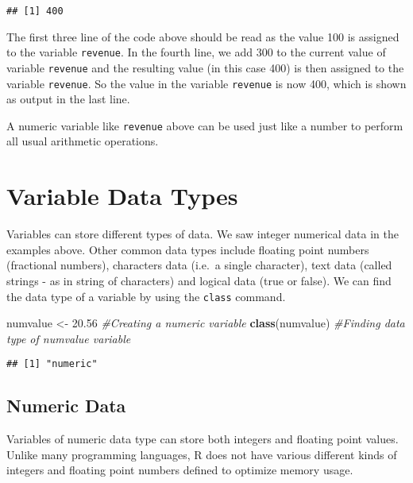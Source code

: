 \documentclass[
]{krantz}
\makeatletter
\newenvironment{Shaded}{\begin{snugshade}}{\end{snugshade}}
\newcommand{\CommentTok}[1]{\textcolor[rgb]{0.37,0.37,0.37}{\textit{#1}}}
\newcommand{\FloatTok}[1]{\textcolor[rgb]{0.06,0.06,0.06}{#1}}
\newcommand{\KeywordTok}[1]{\textcolor[rgb]{0.27,0.27,0.27}{\textbf{#1}}}
\newcommand{\NormalTok}[1]{#1}
\newcommand{\StringTok}[1]{\textcolor[rgb]{0.5,0.5,0.5}{#1}}
\newenvironment{kframe}{%
\medskip{}
\setlength{\fboxsep}{.8em}
 \def\at@end@of@kframe{}%
 \ifinner\ifhmode%
  \def\at@end@of@kframe{\end{minipage}}%
  \begin{minipage}{\columnwidth}%
 \fi\fi%
 \def\FrameCommand##1{\hskip\@totalleftmargin \hskip-\fboxsep
 \colorbox{shadecolor}{##1}\hskip-\fboxsep
     \hskip-\linewidth \hskip-\@totalleftmargin \hskip\columnwidth}%
 \MakeFramed {\advance\hsize-\width
   \@totalleftmargin\z@ \linewidth\hsize
   \@setminipage}}%
 {\par\unskip\endMakeFramed%
 \at@end@of@kframe}
\renewenvironment{Shaded}{\begin{kframe}}{\end{kframe}}
\makeatother
\begin{document}
\begin{verbatim}
## [1] 400
\end{verbatim}

The first three line of the code above should be read as the value 100 is assigned to the variable \texttt{revenue}. In the fourth line, we add 300 to the current value of variable \texttt{revenue} and the resulting value (in this case 400) is then assigned to the variable \texttt{revenue}. So the value in the variable \texttt{revenue} is now 400, which is shown as output in the last line.

A numeric variable like \texttt{revenue} above can be used just like a number to perform all usual arithmetic operations.

\hypertarget{variable-data-types}{%
\section{Variable Data Types}\label{variable-data-types}}

Variables can store different types of data. We saw integer numerical data in the examples above. Other common data types include floating point numbers (fractional numbers), characters data (i.e.~a single character), text data (called strings - as in string of characters) and logical data (true or false). We can find the data type of a variable by using the \texttt{class} command.

\begin{Shaded}
\begin{Highlighting}[]
\NormalTok{numvalue <-}\StringTok{ }\FloatTok{20.56} \CommentTok{#Creating a numeric variable}
\KeywordTok{class}\NormalTok{(numvalue) }\CommentTok{#Finding data type of numvalue variable}
\end{Highlighting}
\end{Shaded}

\begin{verbatim}
## [1] "numeric"
\end{verbatim}

\hypertarget{numeric-data}{%
\subsection{Numeric Data}\label{numeric-data}}

Variables of numeric data type can store both integers and floating point values. Unlike many programming languages, R does not have various different kinds of integers and floating point numbers defined to optimize memory usage.
\end{document}
